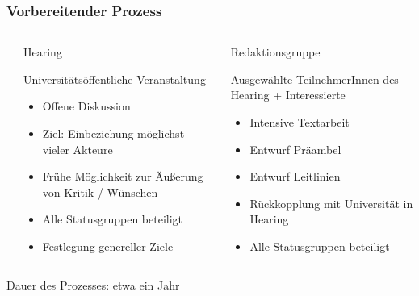 \documentclass[presentation]{beamer}
\begin{document}
\begin{frame}
\frametitle{Vorbereitender Prozess}
\label{sec-2-2}
\begin{columns}[t] %
\label{sec-2-2-1}
\begin{column}{0.48\textwidth}
\begin{exampleblock}{Hearing}
\label{sec-2-2-1-1}

\fontsize{10pt}{12}\selectfont
     Universitätsöffentliche Veranstaltung
\begin{itemize}
\item Offene Diskussion
\item Ziel: Einbeziehung möglichst vieler Akteure
\item Frühe Möglichkeit zur Äußerung von Kritik / Wünschen
\item Alle Statusgruppen beteiligt
\item Festlegung genereller Ziele
\end{itemize}
\end{exampleblock}
\end{column}
\begin{column}{0.48\textwidth}
\begin{exampleblock}{Redaktionsgruppe}
\label{sec-2-2-1-2}

\fontsize{10pt}{12}\selectfont
     Ausgewählte TeilnehmerInnen des Hearing + Interessierte
\begin{itemize}
\item Intensive Textarbeit
\item Entwurf Präambel
\item Entwurf Leitlinien
\item Rückkopplung mit Universität in Hearing
\item Alle Statusgruppen beteiligt
\end{itemize}
      
\end{exampleblock}
\end{column}
\end{columns}
\label{sec-2-2-2}

\newline
\begin{center}
    Dauer des Prozesses: etwa ein Jahr
\end{center}
\end{frame}
\end{document}
